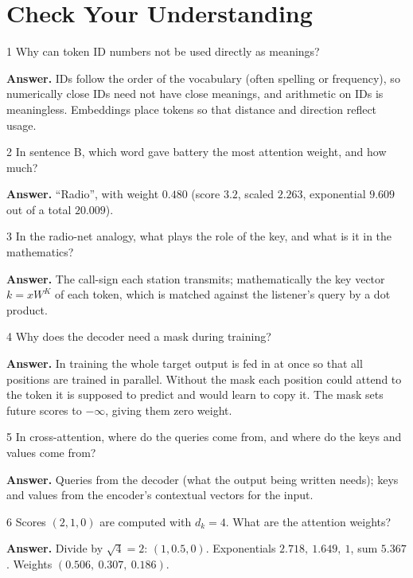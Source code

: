 \documentclass[11pt]{article}
\begin{document}
\section{Check Your Understanding}
\begin{question}{1}
Why can token ID numbers not be used directly as meanings?
\end{question}
\textbf{Answer.} IDs follow the order of the vocabulary (often spelling or frequency), so numerically close IDs need not have close meanings, and arithmetic on IDs is meaningless. Embeddings place tokens so that distance and direction reflect usage.

\begin{question}{2}
In sentence B, which word gave battery the most attention weight, and how much?
\end{question}
\textbf{Answer.} ``Radio'', with weight $0.480$ (score $3.2$, scaled $2.263$, exponential $9.609$ out of a total $20.009$).

\begin{question}{3}
In the radio-net analogy, what plays the role of the key, and what is it in the mathematics?
\end{question}
\textbf{Answer.} The call-sign each station transmits; mathematically the key vector $k=xW^K$ of each token, which is matched against the listener's query by a dot product.

\begin{question}{4}
Why does the decoder need a mask during training?
\end{question}
\textbf{Answer.} In training the whole target output is fed in at once so that all positions are trained in parallel. Without the mask each position could attend to the token it is supposed to predict and would learn to copy it. The mask sets future scores to $-\infty$, giving them zero weight.

\begin{question}{5}
In cross-attention, where do the queries come from, and where do the keys and values come from?
\end{question}
\textbf{Answer.} Queries from the decoder (what the output being written needs); keys and values from the encoder's contextual vectors for the input.

\begin{question}{6}
Scores $(2,1,0)$ are computed with $d_k=4$. What are the attention weights?
\end{question}
\textbf{Answer.} Divide by $\sqrt4=2$: $(1,0.5,0)$. Exponentials $2.718,\ 1.649,\ 1$, sum $5.367$. Weights $(0.506,\ 0.307,\ 0.186)$.
\end{document}
